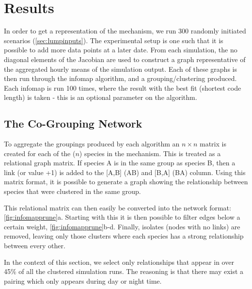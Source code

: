 %


\section{Results}

In order to get a representation of the mechanism, we run 300 randomly initiated scenarios (\autoref{sec:lumpinputs}). The experimental setup is one such that it is possible to add more data points at a later date. From each simulation, the no diagonal elements of the Jacobian are used to construct a graph representative of the aggregated hourly means of the simulation output. Each of these graphs is then run through the infomap algorithm, and a grouping/clustering produced. Each infomap is run 100 times, where the result with the best fit (shortest code length) is taken - this is an optional parameter on the algorithm.

\subsection{The Co-Grouping Network}

To aggregate the groupings produced by each algorithm an $n\times n$ matrix is created for each of the ($n$) species in the mechanism. This is treated as a relational graph matrix. If species A is in the same group as species B, then a link (or value +1) is added to the [A,B] (A\ce{->}B) and [B,A] (B\ce{->}A) column. Using this matrix format, it is possible to generate a graph showing the relationship between species that were clustered in the same group.

This relational matrix can then easily be converted into the network format: \autoref{fig:infomapprune}a. Starting with this it is then possible to filter edges below a certain weight, \autoref{fig:infomapprune}b-d. Finally, isolates (nodes with no links) are removed, leaving only those clusters where each species has a strong relationship between every other.

In the context of this section, we select only relationships that appear in over 45\% of all the clustered simulation runs. The reasoning is that there may exist a pairing which only appears during day or night time.

